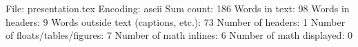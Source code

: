 File: presentation.tex
Encoding: ascii
Sum count: 186
Words in text: 98
Words in headers: 9
Words outside text (captions, etc.): 73
Number of headers: 1
Number of floats/tables/figures: 7
Number of math inlines: 6
Number of math displayed: 0

